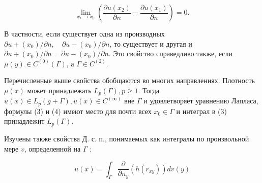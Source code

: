 \documentclass[10pt]{article}
\begin{document}
\[

\lim _{x_{1} \rightarrow x_{0}}\left(\frac{\partial u\left(x_{2}\right)}{\partial n}-\frac{\partial u\left(x_{1}\right)}{\partial n}\right)=0 .

\]



В частности, если существует одна из производных $\partial u+\left(x_{0}\right) / \partial n, \quad \partial u-\left(x_{0}\right) / \partial n$, то существует и другая и $\partial u+\left(x_{0}\right) / \partial n=\partial u-\left(x_{0}\right) / \partial n$. Это свойство справедливо также, если $\mu(y) \in C^{(0)}(\Gamma)$, а $\Gamma \in C^{(2)}$.



Перечисленные выше свойства обобщаются во многих направлениях. Плотность $\mu(x)$ может принадлежать $L_{p}(\Gamma), p \geqslant 1$. Тогда $u(x) \in L_{p}(g+\Gamma), u(x) \in C^{(\infty)}$ вне $\Gamma$ и удовлетворяет уравнению Лапласа, формулы (3) и (4) имеют место для почти всех $x_{0} \in \Gamma$ и интеграл в (3) принадлежит $L_{p}(\Gamma)$.



Изучены также свойства Д. с. п., понимаемых как интегралы по произвольной мере $v$, определенной на $\Gamma$ :



\[

u(x)=\int_{\Gamma} \frac{\partial}{\partial n_{y}}\left(h\left(r_{x y}\right)\right) d v(y)

\]
\end{document}
